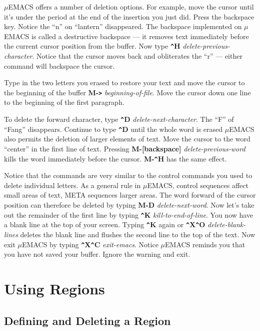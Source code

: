 $\mu$EMACS offers a number of deletion options. For example, move the
cursor until it's under the period at the end of the insertion you just
did. Press the backspace key. Notice the ``n'' on ``lantern''
disappeared. The backspace implemented on $\mu$EMACS is called a
destructive backspace --- it removes text immediately before the
current cursor position from the buffer. Now type {\bf \verb+^+H} {\it
delete-previous-character}. Notice that the cursor moves back and
obliterates the ``r'' --- either command will backspace the cursor.

Type in the two letters you erased to restore your text and move the
cursor to the beginning of the buffer {\bf M-\verb+>+} {\it
beginning-of-file}. Move the cursor down one line to the beginning of
the first paragraph.

To delete the forward character, type {\bf \verb+^+D} {\it
delete-next-character}. The ``F'' of ``Fang'' disappears. Continue to
type {\bf \verb+^+D} until the whole word is erased $\mu$EMACS also
permits the deletion of larger elements of text. Move the cursor to the
word ``center'' in the first line of text. Pressing {\bf M-[backspace]}
{\it delete-previous-word} kills the word immediately before the
cursor. {\bf M-\verb+^+H} has the same effect.

Notice that the commands are very similar to the control commands you
used to delete individual letters. As a general rule in $\mu$EMACS,
control sequences affect small areas of text, META sequences larger
areas. The word forward of the cursor position can therefore be deleted
by typing {\bf M-D} {\it delete-next-word}. Now let's take out the
remainder of the first line by typing {\bf \verb+^+K} {\it
kill-to-end-of-line}. You now have a blank line at the top of your
screen. Typing {\bf \verb+^+K} again or {\bf \verb+^+X\verb+^+O} {\it
delete-blank-lines} deletes the blank line and flushes the second line
to the top of the text. Now exit $\mu$EMACS by typing {\bf
\verb+^+X\verb+^+C} {\it exit-emacs}. Notice $\mu$EMACS reminds you
that you have not saved your buffer. Ignore the warning and exit.

\chapter{Using Regions}

\section{Defining and Deleting a Region}

